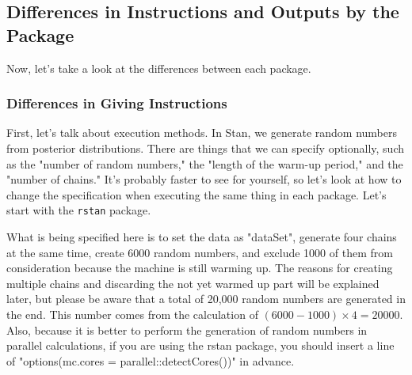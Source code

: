 \documentclass{ltjsbook}
\begin{document}
\subsection{Differences in Instructions and Outputs by the Package}
Now, let's take a look at the differences between each package.
\subsubsection{Differences in Giving Instructions}
First, let's talk about execution methods. In Stan, we generate random numbers from posterior distributions. There are things that we can specify optionally, such as the "number of random numbers," the "length of the warm-up period," and the "number of chains." It's probably faster to see for yourself, so let's look at how to change the specification when executing the same thing in each package. Let's start with the \verb|rstan| package.


What is being specified here is to set the data as "dataSet", generate four chains at the same time, create 6000 random numbers, and exclude 1000 of them from consideration because the machine is still warming up. The reasons for creating multiple chains and discarding the not yet warmed up part will be explained later, but please be aware that a total of 20,000 random numbers are generated in the end. This number comes from the calculation of $(6000-1000)\times4 = 20000$. Also, because it is better to perform the generation of random numbers in parallel calculations, if you are using the rstan package, you should insert a line of "options(mc.cores = parallel::detectCores())" in advance.
\end{document}
